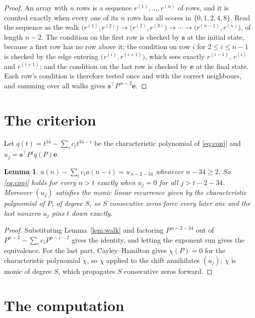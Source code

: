\documentclass[11pt,a4paper]{article}
\theoremstyle{plain}
\newtheorem{lemma}[theorem]{Lemma}
\theoremstyle{definition}
\begin{document}
\begin{proof}
An array with $n$ rows is a sequence $r^{(1)},\dots,r^{(n)}$ of rows, and it is counted
exactly when every one of its $n$ rows has all scores in $\{0,1,2,4,8\}$. Read the sequence as the
walk $\bigl(r^{(1)},r^{(2)}\bigr)\to\bigl(r^{(2)},r^{(3)}\bigr)\to\cdots\to
\bigl(r^{(n-1)},r^{(n)}\bigr)$, of length $n-2$. The condition on the first row is
checked by $\mathbf{s}$ at the initial state, because a first row has no row above it; the
condition on row $i$ for $2\le i\le n-1$ is checked by the edge entering
$\bigl(r^{(i)},r^{(i+1)}\bigr)$, which sees exactly $r^{(i-1)}$, $r^{(i)}$ and
$r^{(i+1)}$; and the condition on the last row is checked by $\mathbf{e}$ at the final
state. Each row's condition is therefore tested once and with the correct neighbours, and
summing over all walks gives $\mathbf{s}^{\!\top}P^{\,n-2}\mathbf{e}$.
\end{proof}

\section{The criterion}

Let $q(t)=t^{34}-\sum_i c_i t^{34-i}$ be the characteristic polynomial of
\eqref{eq:conj} and $u_j=\mathbf{s}^{\!\top}P^{j}q(P)\mathbf{e}$.

\begin{lemma}\label{lem:crit}
$a(n)-\sum_i c_i a(n-i)=u_{\,n-2-34}$ whenever $n-34\ge2$. So \eqref{eq:conj}
holds for every $n>t$ exactly when $u_j=0$ for all $j>t-2-34$. Moreover $(u_j)$
satisfies the monic linear recurrence given by the characteristic polynomial of $P$, of
degree $S$, so $S$ consecutive zeros force every later one and the last nonzero $u_j$ pins
$t$ down exactly.
\end{lemma}

\begin{proof}
Substituting Lemma~\ref{lem:walk} and factoring $P^{\,n-2-34}$ out of
$P^{n-2}-\sum_i c_i P^{n-i-2}$ gives the identity, and letting the exponent run gives the
equivalence. For the last part, Cayley--Hamilton gives $\chi(P)=0$ for the characteristic
polynomial $\chi$, so $\chi$ applied to the shift annihilates $(u_j)$; $\chi$ is monic of
degree $S$, which propagates $S$ consecutive zeros forward.
\end{proof}

\section{The computation}
\end{document}
